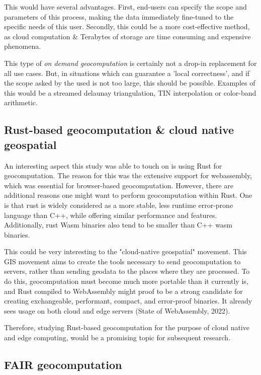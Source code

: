 This would have several advantages. 
First, end-users can specify the scope and parameters of this process, making the data immediately fine-tuned to the specific needs of this user. 
Secondly, this could be a more cost-effective method, as cloud computation \& Terabytes of storage are time consuming and expensive phenomena.

This type of \emph{on demand geocomputation} is certainly not a drop-in replacement for all use cases. 
But, in situations which can guarantee a 'local correctness', and if the scope asked by the used is not too large, this should be possible. 
Examples of this would be a streamed delaunay triangulation, TIN interpolation or color-band arithmetic. 

\subsection{Rust-based geocomputation \& cloud native geospatial}

An interesting aspect this study was able to touch on is using Rust for geocomputation.
The reason for this was the extensive support for webassembly, which was essential for browser-based geocomputation. 
However, there are additional reasons one might want to perform geocomputation within Rust.
One is that rust is widely considered as a more stable, less runtime error-prone language than C++, while offering similar performance and features.
Additionally, rust Wasm binaries also tend to be smaller than C++ wasm binaries.  

This could be very interesting to the "cloud-native geospatial" movement. 
This \ac{GIS} movement aims to create the tools necessary to send geocomputation to servers, rather than sending geodata to the places where they are processed.
To do this, geocomputation must become much more portable than it currently is, and Rust compiled to WebAssembly might proof to be a strong candidate for creating exchangeable, performant, compact, and error-proof binaries.
It already sees usage on both cloud and edge servers (State of WebAssembly, 2022).  

Therefore, studying Rust-based geocomputation for the purpose of cloud native and edge computing, would be a promising topic for subsequent research. 

\subsection{FAIR geocomputation}

